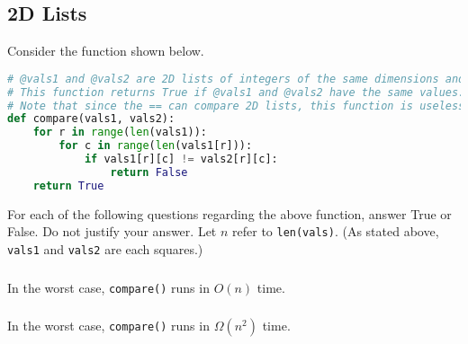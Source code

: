 \documentclass{article}
\begin{document}
\begin{mdframed}
\vspace{3em}
\end{mdframed}

\subsection{2D Lists}

Consider the function shown below.

\begin{lstlisting}[language=Python]
# @vals1 and @vals2 are 2D lists of integers of the same dimensions and are squares.
# This function returns True if @vals1 and @vals2 have the same values.
# Note that since the == can compare 2D lists, this function is useless.
def compare(vals1, vals2):
    for r in range(len(vals1)):
        for c in range(len(vals1[r])):
            if vals1[r][c] != vals2[r][c]:
                return False
    return True
\end{lstlisting}

For each of the following questions regarding the above function, answer True or False. Do not justify your answer. Let $n$ refer to \lstinline{len(vals)}. (As stated above, \lstinline{vals1} and \lstinline{vals2} are each squares.)

\subsubsection{}

In the worst case, \lstinline{compare()} runs in $O(n)$ time.

\begin{mdframed}
\vspace{3em}
\end{mdframed}

\subsubsection{}

In the worst case, \lstinline{compare()} runs in $\Omega(n^2)$ time.

\begin{mdframed}
\vspace{3em}
\end{mdframed}

\subsubsection{}
\end{document}
